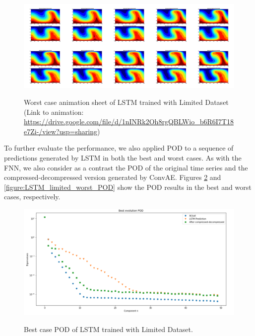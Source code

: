 \begin{figure}[H]
    \centering
    \caption{Worst case animation sheet of LSTM trained with Limited Dataset (Link to animation: 
    \url{https://drive.google.com/file/d/1nINRk2Oh8rgQBLWio_b6R6I7T18e7Zi-/view?usp=sharing})}
    \includegraphics[scale=0.10]{figures/mantle_convection_images/limited_dataset/LSTM_Worst_GIF_sheet.png}
    \label{figure:LSTM_limited_worst_gif}
\end{figure}

To further evaluate the performance, we also applied POD to a sequence of predictions generated by LSTM in both the best and worst cases. As with the FNN, we also consider as a contrast the POD of the original time series and the compressed-decompressed version generated by ConvAE. Figures \ref{figure:LSTM_limited_best_POD} and \ref{figure:LSTM_limited_worst_POD} show the POD results in the best and  worst cases, respectively.

\begin{figure}[H]
    \caption{Best case POD of LSTM trained with Limited Dataset.}
    \includegraphics[scale=0.5]{figures/mantle_convection_images/limited_dataset/LSTM_Best_POD.png}
    \label{figure:LSTM_limited_best_POD}
\end{figure}

